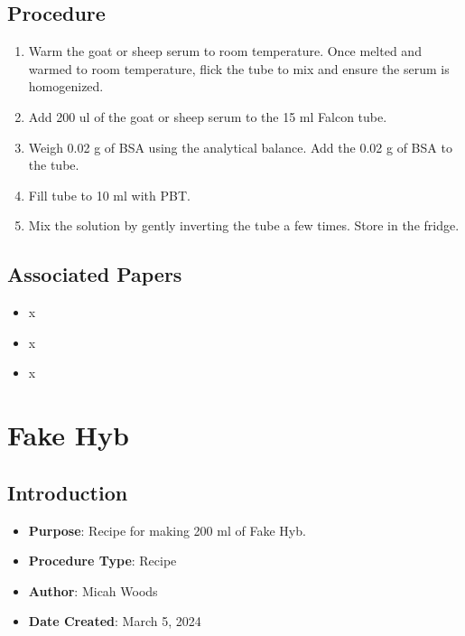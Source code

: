 \documentclass[
  letterpaper,
  DIV=11,
  numbers=noendperiod]{scrreprt}
\providecommand{\tightlist}{%
  \setlength{\itemsep}{0pt}\setlength{\parskip}{0pt}}\usepackage{longtable,booktabs,array}
\begin{document}
\hypertarget{procedure-93}{%
\section{Procedure}\label{procedure-93}}

\begin{enumerate}
\def\labelenumi{\arabic{enumi}.}
\item
  Warm the goat or sheep serum to room temperature. Once melted and
  warmed to room temperature, flick the tube to mix and ensure the serum
  is homogenized.
\item
  Add 200 ul of the goat or sheep serum to the 15 ml Falcon tube.
\item
  Weigh 0.02 g of BSA using the analytical balance. Add the 0.02 g of
  BSA to the tube.
\item
  Fill tube to 10 ml with PBT.
\item
  Mix the solution by gently inverting the tube a few times. Store in
  the fridge.
\end{enumerate}

\hypertarget{associated-papers-68}{%
\section{Associated Papers}\label{associated-papers-68}}

\begin{itemize}
\tightlist
\item
  x
\item
  x
\item
  x
\end{itemize}

\hypertarget{sec-recipe-fake_hyb}{%
\chapter{Fake Hyb}\label{sec-recipe-fake_hyb}}

\hypertarget{introduction-100}{%
\section{Introduction}\label{introduction-100}}

\begin{itemize}
\tightlist
\item
  \textbf{Purpose}: Recipe for making 200 ml of Fake Hyb.
\item
  \textbf{Procedure Type}: Recipe
\item
  \textbf{Author}: Micah Woods
\item
  \textbf{Date Created}: March 5, 2024
\end{itemize}
\end{document}

